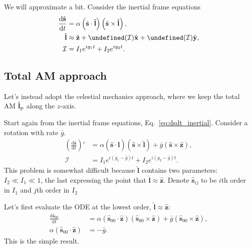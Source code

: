 \documentclass[12pt]{article}
\newcommand*{\rd}[2]{\frac{\mathrm{d}#1}{\mathrm{d}#2}}
\newcommand*{\bm}[1]{\boldsymbol{\mathbf{#1}}}
\newcommand*{\uv}[1]{\hat{\bm{#1}}}
\newcommand*{\p}[1]{\left(#1\right)}
\let\Re\undefined
\let\Im\undefined
\DeclareMathOperator{\Re}{Re}
\DeclareMathOperator{\Im}{Im}
\begin{document}
We will approximate a bit.
Consider the inertial frame equations
\begin{align}
    \rd{\uv{s}}{t}
        &=
            \alpha\p{\uv{s} \cdot \uv{l}}
                \p{\uv{s} \times \uv{l}},\\
    \uv{l}
        &\approx
            \uv{z}
            + \Re(\mathcal{I}) \uv{x}
            + \Im(\mathcal{I}) \uv{y},\\
    \mathcal{I}
        &=
            I_1e^{ig_1t}
            + I_2e^{ig_2t}.\label{eq:dsdt_inertial}
\end{align}

\subsection{Total AM approach}

Let's instead adopt the celestial mechanics approach, where we keep the total AM
$\uv{l}_{\rm p}$ along the $z$-axis.

Start again from the inertial frame equations, Eq.~\eqref{eq:dsdt_inertial}.
Consider a rotation with rate $\bar{g}$.
\begin{align}
    \p{\rd{\uv{s}}{t}}'
        &=
            \alpha\p{\uv{s} \cdot \uv{l}}
                \p{\uv{s} \times \uv{l}}
            + \bar{g}\p{\uv{s} \times \uv{z}}
                ,\\
    \mathcal{I}
        &=
            I_1e^{i(g_1 - \bar{g})t}
            + I_2e^{i(g_2 - \bar{g})t}.
\end{align}
This problem is somewhat difficult because $\uv{l}$ contains two parameters:
$I_2 \ll I_1 \ll 1$, the last expressing the point that $\uv{l} \approx \uv{z}$.
Denote $\uv{s}_{ij}$ to be $i$th order in $I_1$ and $j$th order in $I_2$

Let's first evaluate the ODE at the lowest order, $\uv{l} \approx \uv{z}$:
\begin{align}
    \rd{\uv{s}_{00}}{t}
        &=
            \alpha\p{\uv{s}_{00} \cdot \uv{z}}
                \p{\uv{s}_{00} \times \uv{z}}
            + \bar{g}\p{\uv{s}_{00} \times \uv{z}},\\
    \alpha \p{\uv{s}_{00} \cdot \uv{z}} &= -\bar{g}.
\end{align}
This is the simple result.
\end{document}
